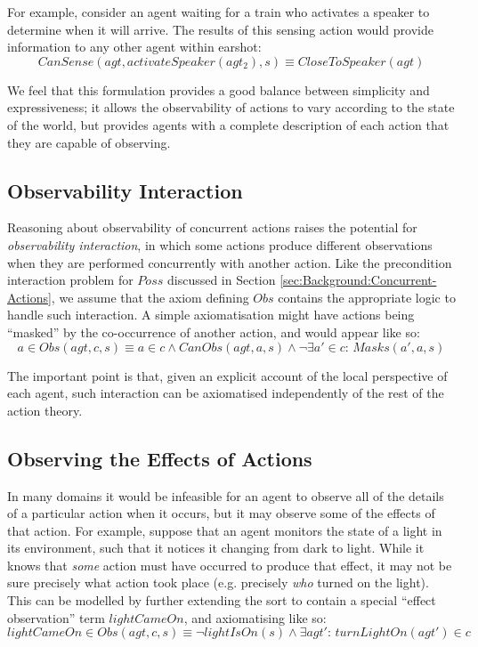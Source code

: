 For example, consider an agent waiting for a train who activates a
speaker to determine when it will arrive. The results of this sensing
action would provide information to any other agent within earshot:\[
CanSense(agt,activateSpeaker(agt_{2}),s)\equiv CloseToSpeaker(agt)\]


We feel that this formulation provides a good balance between simplicity
and expressiveness; it allows the observability of actions to vary
according to the state of the world, but provides agents with a complete
description of each action that they are capable of observing.


\subsection{Observability Interaction}

Reasoning about observability of concurrent actions raises the potential
for \emph{observability interaction}, in which some actions produce
different observations when they are performed concurrently with another
action. Like the precondition interaction problem for $Poss$ discussed
in Section \ref{sec:Background:Concurrent-Actions}, we assume that
the axiom defining $Obs$ contains the appropriate logic to handle
such interaction. A simple axiomatisation might have actions being
{}``masked'' by the co-occurrence of another action, and would appear
like so:\[
a\in Obs(agt,c,s)\equiv a\in c\wedge CanObs(agt,a,s)\wedge\neg\exists a'\in c:\, Masks(a',a,s)\]


The important point is that, given an explicit account of the local
perspective of each agent, such interaction can be axiomatised independently
of the rest of the action theory.


\subsection{Observing the Effects of Actions}

In many domains it would be infeasible for an agent to observe all
of the details of a particular action when it occurs, but it may observe
some of the effects of that action. For example, suppose that an agent
monitors the state of a light in its environment, such that it notices
it changing from dark to light. While it knows that \emph{some} action
must have occurred to produce that effect, it may not be sure precisely
what action took place (e.g. precisely \emph{who} turned on the light).
This can be modelled by further extending the  sort
to contain a special {}``effect observation'' term $lightCameOn$,
and axiomatising like so:\[
lightCameOn\in Obs(agt,c,s)\equiv\neg lightIsOn(s)\wedge\exists agt':\, turnLightOn(agt')\in c\]


